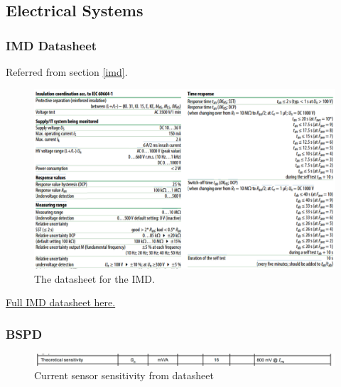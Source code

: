 \documentclass{article}
\begin{document}
\subsection{Electrical Systems}\label{appendix_electrical_systems}
\setcounter{subsubsection}{1}
\subsubsection{IMD Datasheet}\label{IMD_datasheet}
Referred from section \ref{imd}.

\begin{figure} [H]
	\centering  %
	
	\includegraphics[width=\textwidth]{Formula_IMD_Datasheet.png}
	
	\caption{The datasheet for the IMD.}
	
	\label{fig:IMD_Datasheet}
\end{figure}

\href{http://www.bender-us.com/documents/IR155-10_datasheet_NAE1012821.pdf}{Full IMD datasheet here.}

\setcounter{subsubsection}{3}
\subsubsection{BSPD}\label{appendix_bspd}

\begin{figure} [H]
    \centering
    \includegraphics[width=\textwidth]{current_sensor_datasheet.png}
    \caption{Current sensor sensitivity from datasheet}
    \label{fig:current_sensor_datasheet}
\end{figure}
\end{document}
